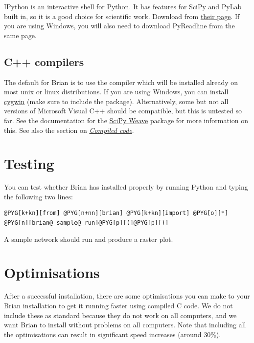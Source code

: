 \documentclass[letterpaper,10pt,english]{manual}
\begin{document}
\href{http://ipython.scipy.org/moin/}{IPython} is an interactive shell for Python.
It has features for SciPy and PyLab built in, so it is a good choice for scientific work.
Download from \href{http://ipython.scipy.org/moin/Download}{their page}. If you are using Windows, you
will also need to download PyReadline from the same page.


\subsection{C++ compilers}

The default for Brian is to use the  compiler which will
be installed already on most unix or linux distributions. If you are using Windows, you can
install \href{http://www.cygwin.com/}{cygwin} (make sure to include the  package). Alternatively,
some but not all versions of Microsoft Visual C++ should be compatible, but this is untested
so far. See the documentation for the \href{http://www.scipy.org/Weave}{SciPy Weave} package for
more information on this. See also the section on \hyperlink{compiled-code}{\emph{Compiled code}}.


\section{Testing}

You can test whether Brian has installed properly by running Python and typing
the following two lines:

\begin{Verbatim}[commandchars=@\[\]]
@PYG[k+kn][from] @PYG[n+nn][brian] @PYG[k+kn][import] @PYG[o][*]
@PYG[n][brian@_sample@_run]@PYG[p][(]@PYG[p][)]
\end{Verbatim}

A sample network should run and produce a raster plot.


\section{Optimisations}

After a successful installation, there are some optimisations you can make to
your Brian installation to get it running faster using compiled C code. We do
not include these as standard because they do not work on all computers, and
we want Brian to install without problems on all computers. Note that including
all the optimisations can result in significant speed increases (around 30\%).
\end{document}
